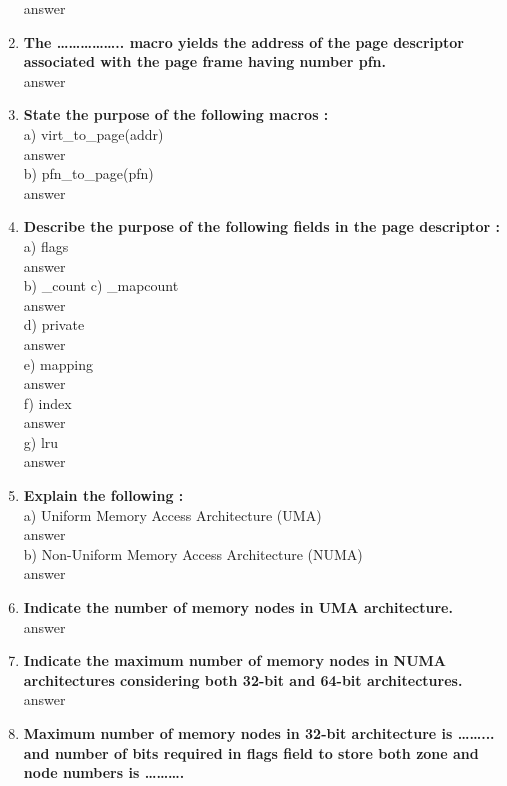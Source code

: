 \documentclass[a4paper,12pt]{article}
\begin{document}
\begin{flushleft}
\begin{enumerate}
{\color{red}answer}\\
\item \textbf{  The …………….. macro yields the address of the page descriptor associated with the page frame having number pfn.}\\
{\color{red}answer}\\
\item \textbf{  State the purpose of the following macros :}\\
a) virt\_to\_page(addr) \\{\color{red}answer}\\
b) pfn\_to\_page(pfn)\\{\color{red}answer}\\
\item \textbf{  Describe the purpose of the following fields in the page descriptor :}\\
a) flags \\{\color{red}answer}\\
b) \_count c) \_mapcount \\{\color{red}answer}\\
d) private\\{\color{red}answer}\\
e) mapping \\{\color{red}answer}\\
f) index \\{\color{red}answer}\\
g) lru\\{\color{red}answer}\\
\item \textbf{  Explain the following :}\\
a) Uniform Memory Access Architecture (UMA)\\{\color{red}answer}\\
b) Non-Uniform Memory Access Architecture (NUMA)\\{\color{red}answer}\\
\item \textbf{  Indicate the number of memory nodes in UMA architecture.}\\
{\color{red}answer}\\
\item \textbf{  Indicate the maximum number of memory nodes in NUMA architectures considering both 32-bit and 64-bit architectures.}\\
{\color{red}answer}\\
\item \textbf{  Maximum number of memory nodes in 32-bit architecture is ……... and number of bits required in flags field to store both zone and node numbers is ……….}\\

\end{enumerate}
\end{flushleft}
\end{document}
